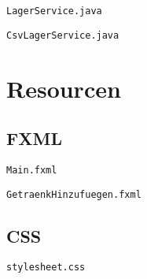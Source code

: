 

\verb|LagerService.java|



\verb|CsvLagerService.java|



\section{Resourcen}

\subsection{FXML}

\verb|Main.fxml|



\verb|GetraenkHinzufuegen.fxml|



\subsection{CSS}

\verb|stylesheet.css|

